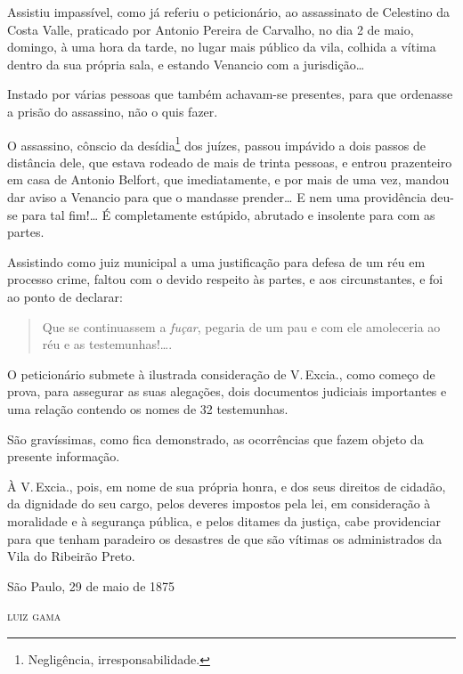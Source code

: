 Assistiu impassível, como já referiu o peticionário, ao assassinato de
Celestino da Costa Valle, praticado por Antonio Pereira de Carvalho, no
dia 2 de maio, domingo, à uma hora da tarde, no lugar mais público da
vila, colhida a vítima dentro da sua própria sala, e estando Venancio
com a jurisdição\ldots{}

Instado por várias pessoas que também achavam-se presentes, para que
ordenasse a prisão do assassino, não o quis fazer.

O assassino, cônscio da desídia\footnote{ Negligência,
  irresponsabilidade.} dos juízes, passou impávido a dois passos de
distância dele, que estava rodeado de mais de trinta pessoas, e entrou
prazenteiro em casa de Antonio Belfort, que imediatamente, e por mais de
uma vez, mandou dar aviso a Venancio para que o mandasse prender\ldots{} E
nem uma providência deu-se para tal fim!\ldots{} É completamente estúpido,
abrutado e insolente para com as partes.

Assistindo como juiz municipal a uma justificação para defesa de um réu
em processo crime, faltou com o devido respeito às partes, e aos
circunstantes, e foi ao ponto de declarar:

\begin{quote}
Que se continuassem a \emph{fuçar}, pegaria de um pau e com ele
amoleceria ao réu e as testemunhas!\ldots{}.
\end{quote}

O peticionário submete à ilustrada consideração de V.\,Excia., como
começo de prova, para assegurar as suas alegações, dois documentos
judiciais importantes e uma relação contendo os nomes de 32 testemunhas.

São gravíssimas, como fica demonstrado, as ocorrências que fazem objeto
da presente informação.

À V.\,Excia., pois, em nome de sua própria honra, e dos seus direitos de
cidadão, da dignidade do seu cargo, pelos deveres impostos pela lei, em
consideração à moralidade e à segurança pública, e pelos ditames da
justiça, cabe providenciar para que tenham paradeiro os desastres de que
são vítimas os administrados da Vila do Ribeirão Preto.

\begin{flushright}
São Paulo, 29 de maio de 1875

\textsc{luiz gama}
\end{flushright}

\asterisc{}
